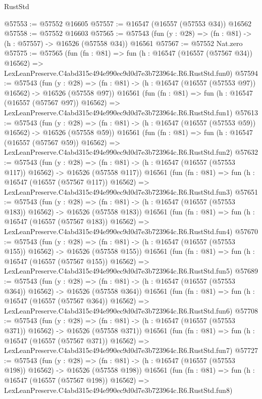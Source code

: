 \begin{lexlean}{RustStd}
\begin{coremodule}
@57553 := @57552 @16605
@57557 := @16547 (@16557 (@57553 @34)) @16562
@57558 := @57552 @16603
@57565 := @57543 (fun (y : @28) => (fn : @81) -> (h : @57557) -> @16526 (@57558 @34)) @16561
@57567 := @57552 Nat.zero
@57575 := @57565
    (fun (fn : @81) =>
    fun (h : @16547 (@16557 (@57567 @34)) @16562) =>
    LexLeanPreserve.C4abd315c494e990ec9d0d7e3b723964c.R6.RustStd.fun0)
@57594 := @57543
    (fun (y : @28) =>
    (fn : @81) -> (h : @16547 (@16557 (@57553 @97)) @16562) -> @16526 (@57558 @97))
    @16561
    (fun (fn : @81) =>
    fun (h : @16547 (@16557 (@57567 @97)) @16562) =>
    LexLeanPreserve.C4abd315c494e990ec9d0d7e3b723964c.R6.RustStd.fun1)
@57613 := @57543
    (fun (y : @28) =>
    (fn : @81) -> (h : @16547 (@16557 (@57553 @59)) @16562) -> @16526 (@57558 @59))
    @16561
    (fun (fn : @81) =>
    fun (h : @16547 (@16557 (@57567 @59)) @16562) =>
    LexLeanPreserve.C4abd315c494e990ec9d0d7e3b723964c.R6.RustStd.fun2)
@57632 := @57543
    (fun (y : @28) =>
    (fn : @81) -> (h : @16547 (@16557 (@57553 @117)) @16562) -> @16526 (@57558 @117))
    @16561
    (fun (fn : @81) =>
    fun (h : @16547 (@16557 (@57567 @117)) @16562) =>
    LexLeanPreserve.C4abd315c494e990ec9d0d7e3b723964c.R6.RustStd.fun3)
@57651 := @57543
    (fun (y : @28) =>
    (fn : @81) -> (h : @16547 (@16557 (@57553 @183)) @16562) -> @16526 (@57558 @183))
    @16561
    (fun (fn : @81) =>
    fun (h : @16547 (@16557 (@57567 @183)) @16562) =>
    LexLeanPreserve.C4abd315c494e990ec9d0d7e3b723964c.R6.RustStd.fun4)
@57670 := @57543
    (fun (y : @28) =>
    (fn : @81) -> (h : @16547 (@16557 (@57553 @155)) @16562) -> @16526 (@57558 @155))
    @16561
    (fun (fn : @81) =>
    fun (h : @16547 (@16557 (@57567 @155)) @16562) =>
    LexLeanPreserve.C4abd315c494e990ec9d0d7e3b723964c.R6.RustStd.fun5)
@57689 := @57543
    (fun (y : @28) =>
    (fn : @81) -> (h : @16547 (@16557 (@57553 @364)) @16562) -> @16526 (@57558 @364))
    @16561
    (fun (fn : @81) =>
    fun (h : @16547 (@16557 (@57567 @364)) @16562) =>
    LexLeanPreserve.C4abd315c494e990ec9d0d7e3b723964c.R6.RustStd.fun6)
@57708 := @57543
    (fun (y : @28) =>
    (fn : @81) -> (h : @16547 (@16557 (@57553 @371)) @16562) -> @16526 (@57558 @371))
    @16561
    (fun (fn : @81) =>
    fun (h : @16547 (@16557 (@57567 @371)) @16562) =>
    LexLeanPreserve.C4abd315c494e990ec9d0d7e3b723964c.R6.RustStd.fun7)
@57727 := @57543
    (fun (y : @28) =>
    (fn : @81) -> (h : @16547 (@16557 (@57553 @198)) @16562) -> @16526 (@57558 @198))
    @16561
    (fun (fn : @81) =>
    fun (h : @16547 (@16557 (@57567 @198)) @16562) =>
    LexLeanPreserve.C4abd315c494e990ec9d0d7e3b723964c.R6.RustStd.fun8)

\end{coremodule}
\end{lexlean}
